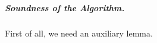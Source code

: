 







































\subparagraph{Soundness of the Algorithm.} First of all, we need an auxiliary lemma.

